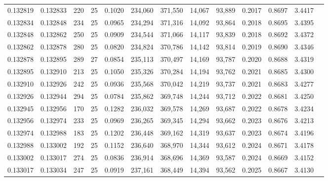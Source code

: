 \begin{tabular}{rrrrrrrrrrrrr}
0.132819 & 0.132833 &   220 &  25 &                                     0.1020 & 234,060 & 371,550 &  14,067 &  93,889 & 0.2017 & 0.8697 & 3.4417 \\
0.132834 & 0.132848 &   234 &  25 &                                     0.0965 & 234,294 & 371,316 &  14,092 &  93,864 & 0.2018 & 0.8695 & 3.4395 \\
0.132848 & 0.132862 &   250 &  25 &                                     0.0909 & 234,544 & 371,066 &  14,117 &  93,839 & 0.2018 & 0.8692 & 3.4372 \\
0.132862 & 0.132878 &   280 &  25 &                                     0.0820 & 234,824 & 370,786 &  14,142 &  93,814 & 0.2019 & 0.8690 & 3.4346 \\
0.132878 & 0.132895 &   289 &  27 &                                     0.0854 & 235,113 & 370,497 &  14,169 &  93,787 & 0.2020 & 0.8688 & 3.4319 \\
0.132895 & 0.132910 &   213 &  25 &                                     0.1050 & 235,326 & 370,284 &  14,194 &  93,762 & 0.2021 & 0.8685 & 3.4300 \\
0.132910 & 0.132926 &   242 &  25 &                                     0.0936 & 235,568 & 370,042 &  14,219 &  93,737 & 0.2021 & 0.8683 & 3.4277 \\
0.132926 & 0.132944 &   294 &  25 &                                     0.0784 & 235,862 & 369,748 &  14,244 &  93,712 & 0.2022 & 0.8681 & 3.4250 \\
0.132945 & 0.132956 &   170 &  25 &                                     0.1282 & 236,032 & 369,578 &  14,269 &  93,687 & 0.2022 & 0.8678 & 3.4234 \\
0.132956 & 0.132974 &   233 &  25 &                                     0.0969 & 236,265 & 369,345 &  14,294 &  93,662 & 0.2023 & 0.8676 & 3.4213 \\
0.132974 & 0.132988 &   183 &  25 &                                     0.1202 & 236,448 & 369,162 &  14,319 &  93,637 & 0.2023 & 0.8674 & 3.4196 \\
0.132988 & 0.133002 &   192 &  25 &                                     0.1152 & 236,640 & 368,970 &  14,344 &  93,612 & 0.2024 & 0.8671 & 3.4178 \\
0.133002 & 0.133017 &   274 &  25 &                                     0.0836 & 236,914 & 368,696 &  14,369 &  93,587 & 0.2024 & 0.8669 & 3.4152 \\
0.133017 & 0.133034 &   247 &  25 &                                     0.0919 & 237,161 & 368,449 &  14,394 &  93,562 & 0.2025 & 0.8667 & 3.4130 \\

\end{tabular}
